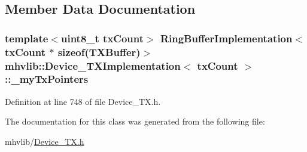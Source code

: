 \subsection{Member Data Documentation}
\hypertarget{classmhvlib_1_1_device___t_x_implementation_ab859df80993132adc5551abbd8870528}{
\subsubsection[{\-\_\-my\-Tx\-Pointers}]{\setlength{\rightskip}{0pt plus 5cm}template$<$uint8\-\_\-t tx\-Count$>$ {\bf Ring\-Buffer\-Implementation}$<$tx\-Count $\ast$ sizeof({\bf T\-X\-Buffer})$>$ {\bf mhvlib\-::\-Device\-\_\-\-T\-X\-Implementation}$<$ tx\-Count $>$\-::\-\_\-my\-Tx\-Pointers\hspace{0.3cm}{\ttfamily [protected]}}}\label{classmhvlib_1_1_device___t_x_implementation_ab859df80993132adc5551abbd8870528}


Definition at line 748 of file Device\-\_\-\-T\-X.\-h.



The documentation for this class was generated from the following file\-:\begin{DoxyCompactItemize}
\item 
mhvlib/\hyperlink{_device___t_x_8h}{Device\-\_\-\-T\-X.\-h}\end{DoxyCompactItemize}
